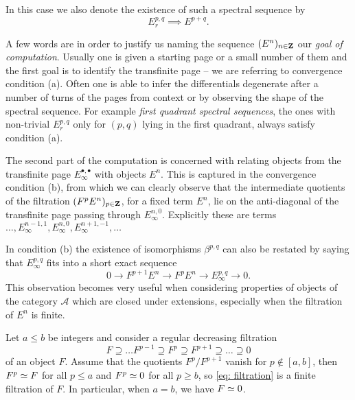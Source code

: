 \begin{definition}
In this case we also denote the existence of such a spectral sequence by 
\[
    E^{p,q}_r \implies E^{p+q}.
\]
\end{definition}

\begin{remark}
    A few words are in order to justify us naming the sequence $(E^n)_{n \in \mathbf Z}$ our \emph{goal of computation}. Usually one is given a starting page or a small number of them and the first goal is to identify the transfinite page -- we are referring to convergence condition (a). Often one is able to infer the differentials degenerate after a number of turns of the pages from context or by observing the shape of the spectral sequence. For example \emph{first quadrant spectral sequences}, \ie the ones with non-trivial $E^{p,q}_r$ only for $(p,q)$ lying in the first quadrant, always satisfy condition (a).

    The second part of the computation is concerned with relating objects from the transfinite page $E^{\bullet, \bullet}_\infty$ with objects $E^n$. This is captured in the convergence condition (b), from which we can clearly observe that the intermediate quotients of the filtration $(F^p E^n)_{p \in \mathbf Z}$, for a fixed term $E^n$, lie on the anti-diagonal
    of the transfinite page passing through \eg $E^{n, 0}_\infty$. Explicitly these are terms $\dots, E^{n-1,1}_\infty, E^{n,0}_\infty, E^{n+1,-1}_\infty, \dots$
    
    In condition (b) the existence of isomorphisms $\beta^{p,q}$ can also be restated by saying that $E^{p,q}_\infty$ fits into a short exact sequence
    \begin{equation}
        \label{eq: SES of filtration}
        0 \to F^{p + 1} E^n \to F^p E^n \to E^{p,q}_\infty \to 0.
    \end{equation}
    This observation becomes very useful when considering properties of objects of the category $\mathcal A$ which are closed under extensions, especially when the filtration of $E^n$ is finite.

 \end{remark}

\begin{lemma}
    \label{finite filtration}
    Let $a \leq b$ be integers and consider a regular decreasing filtration
    \begin{equation}
        \label{eq: filtration}
        F \supseteq \dots F^{p-1} \supseteq F^p \supseteq F^{p + 1} \supseteq \dots \supseteq 0
    \end{equation}
    of an object $F$. Assume that the quotients $F^p/F^{p+1}$ vanish for $p \notin [a,b]$, then $F^{p} \simeq F$ for all $p \leq a$ and $F^{p} \simeq 0$ for all $p \geq b$, so \eqref{eq: filtration} is a finite filtration of $F$. In particular, when $a = b$, we have $F \simeq 0$.
\end{lemma}

